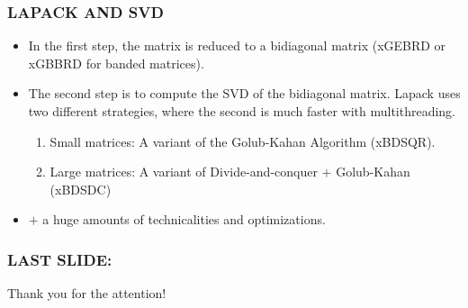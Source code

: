\documentclass[a4paper,8pt]{beamer} %
\begin{document}
\begin{frame}%
\frametitle{LAPACK AND SVD}
\begin{itemize}
	\item In the first step, the matrix is reduced to a bidiagonal matrix 
		(xGEBRD or xGBBRD for banded matrices).
	\item The second step is to compute the SVD of the bidiagonal matrix. 
		Lapack uses two different strategies, where the second is much faster with multithreading.
		\begin{enumerate}
			\item Small matrices: A variant of the Golub-Kahan Algorithm (xBDSQR).
			\item Large matrices: A variant of Divide-and-conquer $+$ Golub-Kahan (xBDSDC)
		\end{enumerate}
	\item $+$ a huge amounts of technicalities and optimizations.
\end{itemize}
\end{frame}%
\begin{frame}%
\frametitle{LAST SLIDE:}
	\begin{bf}
		\begin{large}
			\begin{center}
				Thank you for the attention!
				\nocite{*}
			\end{center}
		\end{large}
	\end{bf}
\end{frame}%
\end{document}
